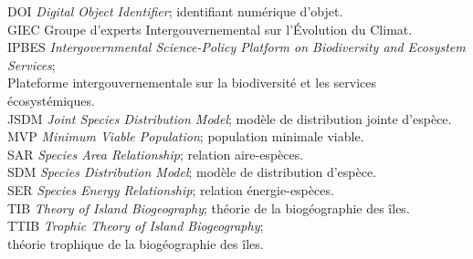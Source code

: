 \listeabrev
\begin{tabbing}
DOI \hspace{.8cm} \= \textit{Digital Object Identifier}; identifiant numérique d'objet. \\[.25cm]
GIEC \> Groupe d'experts Intergouvernemental sur l'Évolution du Climat. \\[.25cm]
IPBES \> \textit{Intergovernmental Science-Policy Platform on Biodiversity and Ecosystem} \\[-.25cm] \> \textit{Services}; \\[-.25cm]
\> Plateforme intergouvernementale sur la biodiversité et les services \\[-.25cm] \> écosystémiques. \\[.25cm]
JSDM \> \textit{Joint Species Distribution Model}; modèle de distribution jointe d'espèce. \\[.25cm]
MVP \> \textit{Minimum Viable Population}; population minimale viable. \\[.25cm]
SAR \> \textit{Species Area Relationship}; relation aire-espèces. \\[.25cm]
SDM \> \textit{Species Distribution Model}; modèle de distribution d'espèce. \\[.25cm]
SER \> \textit{Species Energy Relationship}; relation énergie-espèces. \\[.25cm]
TIB \> \textit{Theory of Island Biogeography}; théorie de la biogéographie des îles. \\[.25cm]
TTIB \> \textit{Trophic Theory of Island Biogeography}; \\[-.25cm]
\> théorie trophique de la biogéographie des îles.
\end{tabbing}
%


%
%


